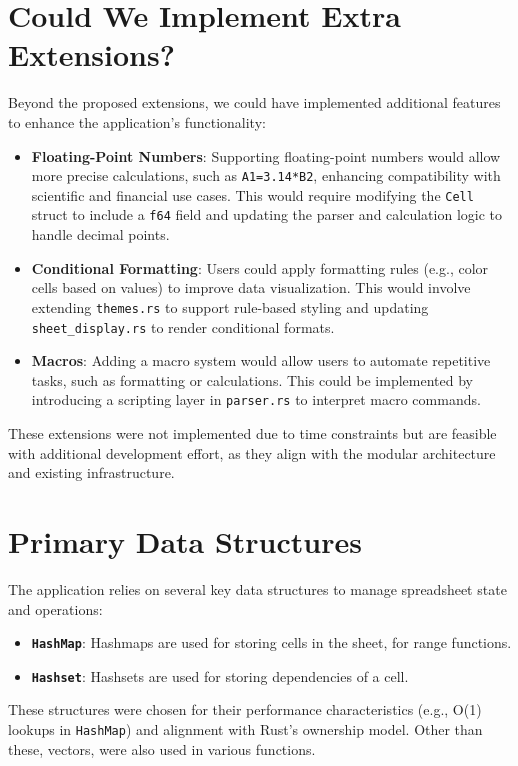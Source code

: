 \documentclass{article}
\begin{document}
\section{Could We Implement Extra Extensions?}
Beyond the proposed extensions, we could have implemented additional features to enhance the application’s functionality:

\begin{itemize}
    \item \textbf{Floating-Point Numbers}: Supporting floating-point numbers would allow more precise calculations, such as \texttt{A1=3.14*B2}, enhancing compatibility with scientific and financial use cases. This would require modifying the \texttt{Cell} struct to include a \texttt{f64} field and updating the parser and calculation logic to handle decimal points.
    \item \textbf{Conditional Formatting}: Users could apply formatting rules (e.g., color cells based on values) to improve data visualization. This would involve extending \texttt{themes.rs} to support rule-based styling and updating \texttt{sheet\_display.rs} to render conditional formats.
    \item \textbf{Macros}: Adding a macro system would allow users to automate repetitive tasks, such as formatting or calculations. This could be implemented by introducing a scripting layer in \texttt{parser.rs} to interpret macro commands.
\end{itemize}

These extensions were not implemented due to time constraints but are feasible with additional development effort, as they align with the modular architecture and existing infrastructure.

\section{Primary Data Structures}
The application relies on several key data structures to manage spreadsheet state and operations:

\begin{itemize}
    \item \textbf{\texttt{HashMap}}: Hashmaps are used for storing cells in the sheet, for range functions.
    \item \textbf{\texttt{Hashset}}: Hashsets are used for storing dependencies of a cell.
\end{itemize}

These structures were chosen for their performance characteristics (e.g., O(1) lookups in \texttt{HashMap}) and alignment with Rust’s ownership model. Other than these, vectors, were also used in various functions.
\end{document}
